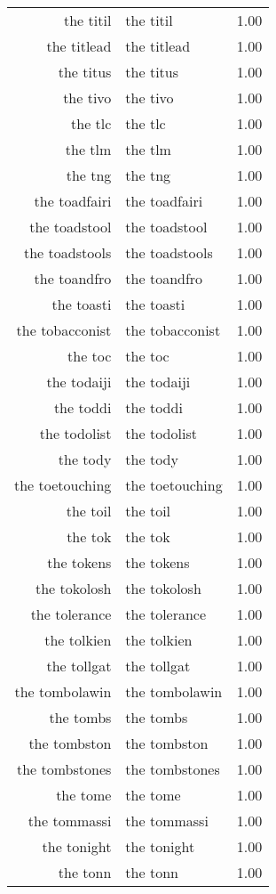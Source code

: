\begin{table}[ht]
\begin{tabular}{rlr}
  the titil & the titil & 1.00 \\ 
  the titlead & the titlead & 1.00 \\ 
  the titus & the titus & 1.00 \\ 
  the tivo & the tivo & 1.00 \\ 
  the tlc & the tlc & 1.00 \\ 
  the tlm & the tlm & 1.00 \\ 
  the tng & the tng & 1.00 \\ 
  the toadfairi & the toadfairi & 1.00 \\ 
  the toadstool & the toadstool & 1.00 \\ 
  the toadstools & the toadstools & 1.00 \\ 
  the toandfro & the toandfro & 1.00 \\ 
  the toasti & the toasti & 1.00 \\ 
  the tobacconist & the tobacconist & 1.00 \\ 
  the toc & the toc & 1.00 \\ 
  the todaiji & the todaiji & 1.00 \\ 
  the toddi & the toddi & 1.00 \\ 
  the todolist & the todolist & 1.00 \\ 
  the tody & the tody & 1.00 \\ 
  the toetouching & the toetouching & 1.00 \\ 
  the toil & the toil & 1.00 \\ 
  the tok & the tok & 1.00 \\ 
  the tokens & the tokens & 1.00 \\ 
  the tokolosh & the tokolosh & 1.00 \\ 
  the tolerance & the tolerance & 1.00 \\ 
  the tolkien & the tolkien & 1.00 \\ 
  the tollgat & the tollgat & 1.00 \\ 
  the tombolawin & the tombolawin & 1.00 \\ 
  the tombs & the tombs & 1.00 \\ 
  the tombston & the tombston & 1.00 \\ 
  the tombstones & the tombstones & 1.00 \\ 
  the tome & the tome & 1.00 \\ 
  the tommassi & the tommassi & 1.00 \\ 
  the tonight & the tonight & 1.00 \\ 
  the tonn & the tonn & 1.00 \\ 

\end{tabular}
\end{table}
